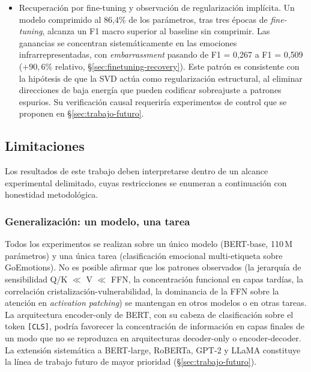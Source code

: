 \begin{itemize}
  \item Recuperación por fine-tuning y observación de regularización
        implícita. Un modelo comprimido al 86{,}4\% de los parámetros, tras
        tres épocas de \emph{fine-tuning}, alcanza un F1 macro superior al baseline
        sin comprimir. Las ganancias se concentran sistemáticamente en las
        emociones infrarrepresentadas, con \emph{embarrassment} pasando de
        F1 = 0{,}267 a F1 = 0{,}509 ($+90{,}6\%$ relativo,
        \S\ref{sec:finetuning-recovery}). Este patrón es consistente con la
        hipótesis de que la SVD actúa como regularización estructural,
        al eliminar direcciones de baja energía que pueden codificar
        sobreajuste a patrones espurios. Su verificación
        causal requeriría experimentos de control que se proponen en
        \S\ref{sec:trabajo-futuro}.
\end{itemize}


\subsection{Limitaciones}
\label{sec:limitaciones}

Los resultados de este trabajo deben interpretarse dentro de un alcance
experimental delimitado, cuyas restricciones se enumeran a continuación con
honestidad metodológica.

\subsubsection{Generalización: un modelo, una tarea}

Todos los experimentos se realizan sobre un único modelo (BERT-base, 110\,M
parámetros) y una única tarea (clasificación emocional multi-etiqueta sobre
GoEmotions). No es posible afirmar que los patrones observados (la
jerarquía de sensibilidad Q/K $\ll$ V $\ll$ FFN, la concentración funcional
en capas tardías, la correlación cristalización-vulnerabilidad, la
dominancia de la FFN sobre la atención en \emph{activation patching}) se
mantengan en otros modelos o en otras tareas. La arquitectura encoder-only de
BERT, con su cabeza de clasificación sobre el token \texttt{[CLS]}, podría
favorecer la concentración de información en capas finales de un modo que no
se reproduzca en arquitecturas decoder-only o encoder-decoder. La extensión
sistemática a BERT-large, RoBERTa, GPT-2 y LLaMA constituye la línea de
trabajo futuro de mayor prioridad (\S\ref{sec:trabajo-futuro}).

